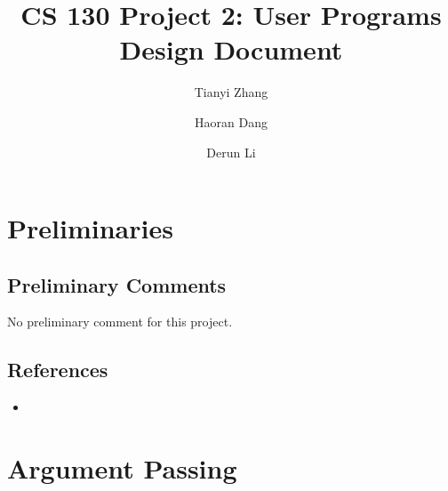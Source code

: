 \documentclass[sigconf, nonacm, balance=false, urlbreakonhyphens=true]{acmart}
\begin{document}
    \title{CS 130 Project 2: User Programs\\Design Document}

    \author{Tianyi Zhang}

    \author{Haoran Dang}

    \author{Derun Li}

    \maketitle

    \setcounter{section}{-1}

    \section{Preliminaries}
        \subsection{Preliminary Comments}

        No preliminary comment for this project. 

        \subsection{References}
        
            \begin{itemize}
                \item
            \end{itemize} 
    
    \section{Argument Passing}
            
\end{document}
